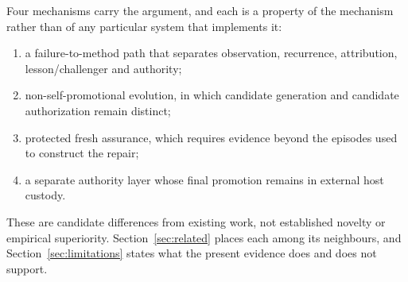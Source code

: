 Four mechanisms carry the argument, and each is a property of the mechanism rather than of any particular system that implements it:

\begin{enumerate}
  \item a failure-to-method path that separates observation, recurrence, attribution, lesson/challenger and authority;
  \item non-self-promotional evolution, in which candidate generation and candidate authorization remain distinct;
  \item protected fresh assurance, which requires evidence beyond the episodes used to construct the repair;
  \item a separate authority layer whose final promotion remains in external host custody.
\end{enumerate}

These are candidate differences from existing work, not established novelty or empirical superiority. Section~\ref{sec:related} places each among its neighbours, and Section~\ref{sec:limitations} states what the present evidence does and does not support.
